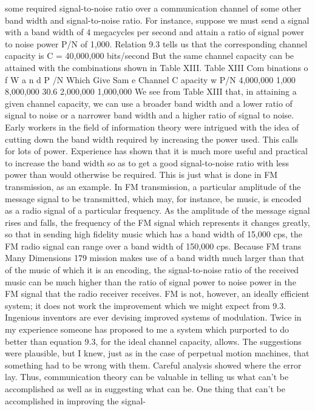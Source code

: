 {{{{{{{{{{{some required signal-to-noise ratio over a communication channel
of some other band width and signal-to-noise ratio. For instance,
suppose we must send a signal with a band width of 4 megacycles
per second and attain a ratio of signal power to noise power P/N
of 1,000. Relation 9.3 tells us that the corresponding channel
capacity is
C = 40,000,000 bits/second
But the same channel capacity can be attained with the combinations
shown in Table XIII.
Table XIII
Com binations o f W a n d P /N Which Give
Sam e Channel C apacity
w P/N
4,000,000 1,000
8,000,000 30.6
2,000,000 1,000,000
We see from Table XIII that, in attaining a given channel
capacity, we can use a broader band width and a lower ratio of
signal to noise or a narrower band width and a higher ratio of
signal to noise.
Early workers in the field of information theory were intrigued
with the idea of cutting down the band width required by increasing
the power used. This calls for lots of power. Experience has
shown that it is much more useful and practical to increase the
band width so as to get a good signal-to-noise ratio with less power
than would otherwise be required.
This is just what is done in FM transmission, as an example. In
FM transmission, a particular amplitude of the message signal to
be transmitted, which may, for instance, be music, is encoded as
a radio signal of a particular frequency. As the amplitude of the
message signal rises and falls, the frequency of the FM signal
which represents it changes greatly, so that in sending high fidelity
music which has a band width of 15,000 cps, the FM radio signal
can range over a band width of 150,000 cps. Because FM trans
Many Dimensions
179
mission makes use of a band width much larger than that of the
music of which it is an encoding, the signal-to-noise ratio of the
received music can be much higher than the ratio of signal power
to noise power in the FM signal that the radio receiver receives.
FM is not, however, an ideally efficient system; it does not work
the improvement which we might expect from 9.3.
Ingenious inventors are ever devising improved systems of modulation.
Twice in my experience someone has proposed to me a
system which purported to do better than equation 9.3, for the ideal
channel capacity, allows. The suggestions were plausible, but I
knew, just as in the case of perpetual motion machines, that
something had to be wrong with them. Careful analysis showed
where the error lay. Thus, communication theory can be valuable
in telling us what can’t be accomplished as well as in suggesting
what can be.
One thing that can’t be accomplished in improving the signal-
}}}}}}}}}}}
